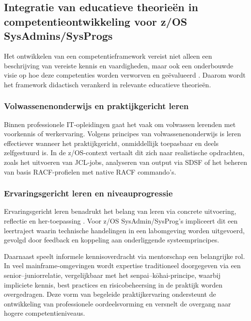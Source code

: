\subsection{Integratie van educatieve theorieën in competentieontwikkeling voor z/OS SysAdmins/SysProgs}
\label{sec:integratie-educatieve-theorie}

Het ontwikkelen van een competentieframework vereist niet alleen een beschrijving van vereiste kennis en vaardigheden, maar ook een onderbouwde visie op hoe deze competenties worden verworven en geëvalueerd \autocite{mulder2014competence}. Daarom wordt het framework didactisch verankerd in relevante educatieve theorieën.

\subsubsection{Volwassenenonderwijs en praktijkgericht leren}

Binnen professionele IT-opleidingen gaat het vaak om volwassen lerenden met voorkennis of werkervaring. Volgens principes van volwassenenonderwijs is leren effectiever wanneer het praktijkgericht, onmiddellijk toepasbaar en deels zelfgestuurd is. In de z/OS-context vertaalt dit zich naar realistische opdrachten, zoals het uitvoeren van JCL-jobs, analyseren van output via SDSF of het beheren van basis RACF-profielen met native RACF commando's.

\subsubsection{Ervaringsgericht leren en niveauprogressie}

Ervaringsgericht leren benadrukt het belang van leren via concrete uitvoering, reflectie en her-toepassing \autocite{kolb2015experiential}. Voor z/OS SysAdmin/SysProg's impliceert dit een leertraject waarin technische handelingen in een labomgeving worden uitgevoerd, gevolgd door feedback en koppeling aan onderliggende systeemprincipes. 

Daarnaast speelt informele kennisoverdracht via mentorschap een belangrijke rol. In veel mainframe-omgevingen wordt expertise traditioneel doorgegeven via een senior–juniorrelatie, vergelijkbaar met het senpai–kōhai-principe, waarbij impliciete kennis, best practices en risicobeheersing in de praktijk worden overgedragen. Deze vorm van begeleide praktijkervaring ondersteunt de ontwikkeling van professionele oordeelsvorming en versnelt de overgang naar hogere competentieniveaus.

